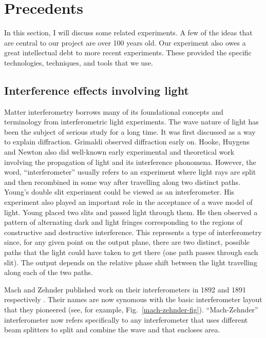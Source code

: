 \section{Precedents}
In this section, I will discuss some related experiments. A few of the ideas that are central to our project are over 100 years old. Our experiment also owes a great intellectual debt to more recent experiments. These provided the specific technologies, techniques, and tools that we use. 
 \subsection{Interference effects involving light}
Matter interferometry borrows many of its foundational concepts and terminology from interferometric light experiments.
The wave nature of light has been the subject of serious study for a long time. It was first discussed as a way to explain diffraction.
Grimaldi observed diffraction early on. Hooke, Huygens and Newton also did well-known early experimental and theoretical work involving the propagation of light and its interference phonomena. 
However, the word, ``interferometer'' usually refers to an experiment where light rays are split and then recombined in some way after travelling along two distinct paths. 
Young's double slit experiment could be viewed as an interferometer. His experiment also played an important role in the acceptance of a wave model of light. Young placed two slits and passed light through them. He then observed a pattern of alternating dark and light fringes corresponding to the regions of constructive and destructive interference. This represents a type of interferometry since, for any given point on the output plane, there are two distinct, possible paths that the light could have taken to get there (one path passes through each slit). The output depends on the relative phase shift between the light travelling along each of the two paths. 

Mach and Zehnder published work on their interferometers in 1892 and 1891 respectively \cite{mach}\cite{zehnder}. Their names are now synomous with the basic interferometer layout that they pioneered (see, for example, Fig.~\ref{mach-zehnder-fig}).  ``Mach-Zehnder'' interferometer now refers specifically to any interferometer that uses different beam splitters to split and combine the wave and that encloses area.

